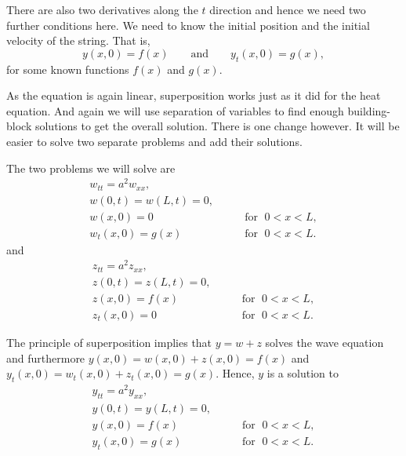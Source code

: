 There are also two derivatives along the $t$ direction and hence we need
two further conditions here.  We need to know the initial position
and the initial velocity of the string.  That is,
\begin{equation*}
y(x,0) = f(x)  \qquad \text{and} \qquad y_t (x,0) =
g(x) ,
\end{equation*}
for some known functions $f(x)$ and $g(x)$.

As the equation is again linear, superposition works just as it did for the
heat equation.  And again we will use separation of variables to find
enough building-block solutions to get the overall solution.  There is
one change however.  It will be easier to solve two separate problems
and add their solutions.

The two problems we will solve are
\begin{equation} \label{wave:weq}
\begin{array}{ll}
w_{tt} = a^2 w_{xx} , &  \\
w(0,t) = w(L,t) = 0 , &  \\
w(x,0) = 0 & \qquad \text{for } \; 0 < x < L , \\
w_t(x,0) = g(x) & \qquad \text{for } \; 0 < x < L .
\end{array}
\end{equation}
and
\begin{equation} \label{wave:zeq}
\begin{array}{ll}
z_{tt} = a^2 z_{xx} , &  \\
z(0,t) = z(L,t) = 0 , &  \\
z(x,0) = f(x) & \qquad \text{for } \; 0 < x < L , \\
z_t(x,0) = 0 & \qquad \text{for } \; 0 < x < L .
\end{array}
\end{equation}

The principle of superposition implies that
$y = w + z$ solves the wave equation and furthermore
$y(x,0) = w(x,0) + z(x,0) = f(x)$ and
$y_t(x,0) = w_t(x,0) + z_t(x,0) = g(x)$.  Hence, $y$ is
a solution to
\begin{equation} \label{wave:yeq}
\begin{array}{ll}
y_{tt} = a^2 y_{xx} , &  \\
y(0,t) = y(L,t) = 0 , &  \\
y(x,0) = f(x) & \qquad \text{for } \; 0 < x < L , \\
y_t(x,0) = g(x) & \qquad \text{for } \; 0 < x < L .
\end{array}
\end{equation}

